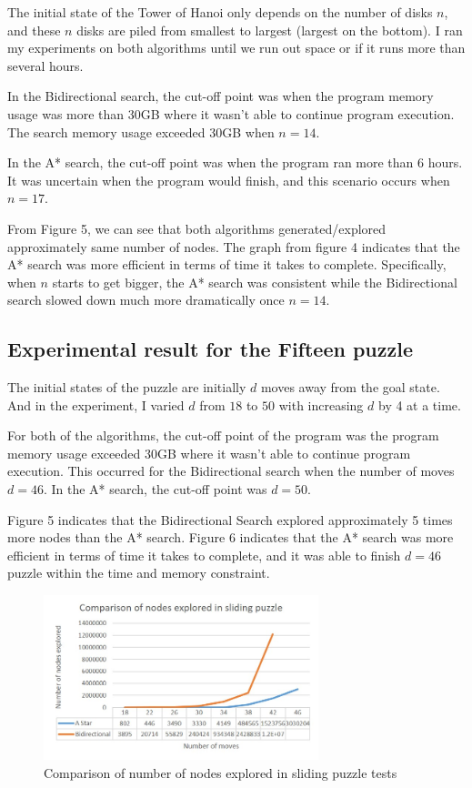 \documentclass[conference]{IEEEtran}
\begin{document}
The initial state of the Tower of Hanoi only depends on the number of disks $n$, and these $n$ disks are piled from smallest to largest (largest on the bottom). I ran my experiments on both algorithms until we run out space or if it runs more than several hours.

In the Bidirectional search, the cut-off point was when the program memory usage was more than 30GB where it wasn't able to continue program execution. The search memory usage exceeded 30GB when $n = 14$.

In the A* search, the cut-off point was when the program ran more than 6 hours. It was uncertain when the program would finish, and this scenario occurs when $n = 17$. 

From Figure 5, we can see that both algorithms generated/explored approximately same number of nodes. 
The graph from figure 4 indicates that the A* search was more efficient in terms of time it takes to complete. Specifically, when $n$ starts to get bigger, the A* search was consistent while the Bidirectional search slowed down much more dramatically once $n = 14$. 

\subsection{Experimental result for the Fifteen puzzle}

The initial states of the puzzle are initially $d$ moves away from the goal state. And in the experiment, I varied $d$ from $18$ to $50$ with increasing $d$ by 4 at a time.

For both of the algorithms, the cut-off point of the program was the program memory usage exceeded 30GB where it wasn't able to continue program execution. This occurred for the Bidirectional search when the number of moves $d = 46$. In the A* search, the cut-off point was $d = 50$. 

Figure 5 indicates that the Bidirectional Search explored approximately 5 times more nodes than the A* search. Figure 6 indicates that the A* search was more efficient in terms of time it takes to complete, and it was able to finish $d = 46$ puzzle within the time and memory constraint.

\begin{figure}[!t]
\includegraphics[width=8cm]{slidingNodes}
\centering
\caption{Comparison of number of nodes explored in sliding puzzle tests}
\label{fig_sim}
\end{figure}
\end{document}
